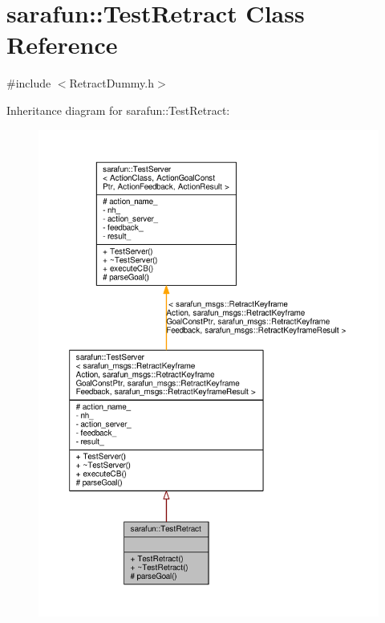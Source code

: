 \hypertarget{classsarafun_1_1TestRetract}{\section{sarafun\-:\-:Test\-Retract Class Reference}
\label{classsarafun_1_1TestRetract}
}


{\ttfamily \#include $<$Retract\-Dummy.\-h$>$}



Inheritance diagram for sarafun\-:\-:Test\-Retract\-:\nopagebreak
\begin{figure}[H]
\begin{center}
\leavevmode
\includegraphics[width=350pt]{d4/db6/classsarafun_1_1TestRetract__inherit__graph}
\end{center}
\end{figure}


